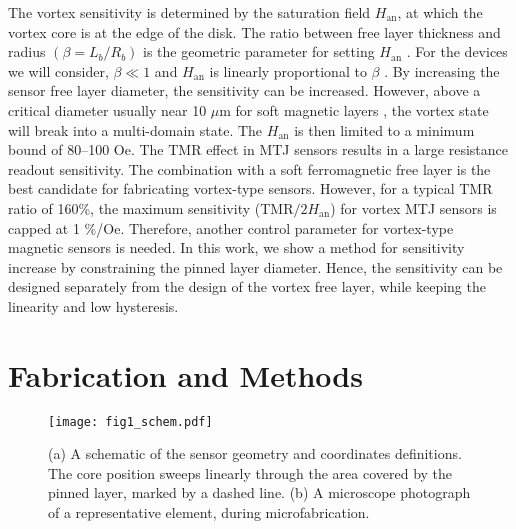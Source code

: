 \documentclass[10pt]{iopart}
\begin{document}
    The vortex sensitivity is determined by the saturation field $H_\mathrm{an}$, at which the vortex core is at the edge of the disk. The ratio between free layer thickness and radius $(\beta = L_b/R_b)$ is the geometric parameter for setting $H_\mathrm{an}$ \cite{guslienko_2001a}. For the devices we will consider, $\beta \ll 1$ and $H_\mathrm{an}$ is linearly proportional to $\beta$ \cite{guslienko_2002}. By increasing the sensor free layer diameter, the sensitivity can be increased. However, above a critical diameter usually near 10 $\mu$m for soft magnetic layers \cite{he_2020}, the vortex state will break into a multi-domain state. The $H_\mathrm{an}$ is then limited to a minimum bound of 80--100 Oe.
    The TMR effect in MTJ sensors results in a large resistance readout sensitivity. The combination with a soft ferromagnetic free layer is the best candidate for fabricating vortex-type sensors.
    However, for a typical TMR ratio of 160\%, the maximum sensitivity (TMR$/2H_\mathrm{an}$) for vortex MTJ sensors is capped at 1 \%/Oe. Therefore, another control parameter for vortex-type magnetic sensors is needed. In this work, we show a method for sensitivity increase by constraining the pinned layer diameter. Hence, the sensitivity can be designed separately from the design of the vortex free layer, while keeping the linearity and low hysteresis.


\section{Fabrication and Methods}
    
    \begin{figure}
        \texttt{[image: fig1\_schem.pdf]}
        \caption{(a) A schematic of the sensor geometry and coordinates definitions. The core position sweeps linearly through the area covered by the pinned layer, marked by a dashed line.  (b) A microscope photograph of a representative element, during microfabrication.}
        \label{fig:schem}
    \end{figure}
    
\end{document}

